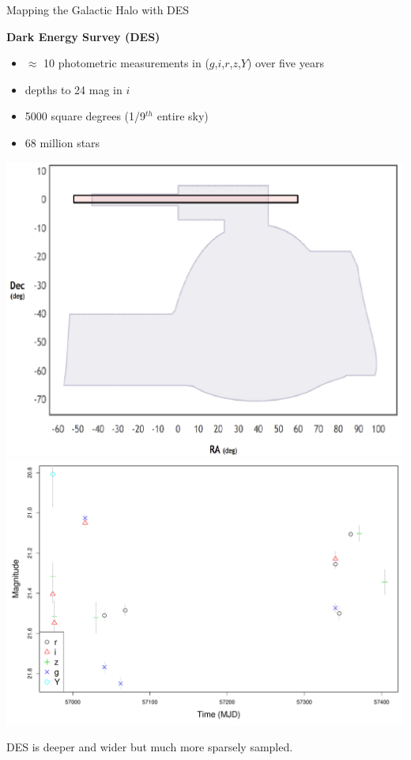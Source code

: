 \documentclass[12pt]{beamer}
\begin{document}
\begin{frame}{Mapping the Galactic Halo with DES}

\textbf{Dark Energy Survey (DES)}
\begin{itemize}
\item $\approx$ 10 photometric measurements in ($g$,$i$,$r$,$z$,$Y$) over five years
\item depths to 24 mag in $i$
\item 5000 square degrees (1/9$^{th}$ entire sky)
\item 68 million stars
\end{itemize}

\vspace{.1in}

\includegraphics[scale=0.3]{figs/des_sdss_stripe82.pdf}
\includegraphics[scale=0.2]{figs/des_2.pdf}

\vspace{.1in}

\begin{center}
DES is deeper and wider but much more sparsely sampled.
\end{center}

\end{frame}
\end{document}
